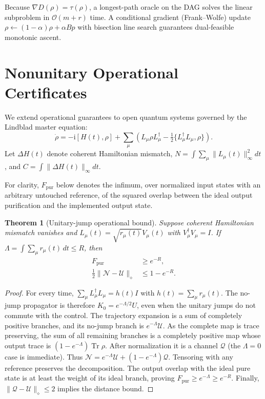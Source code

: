 \documentclass[10pt,letterpaper,journal]{IEEEtran}
\newtheorem{theorem}{Theorem}
\begin{document}
Because $\nabla D(\rho) = \tau(\rho)$, a longest-path oracle on the DAG solves the linear subproblem in $\mathcal{O}(m+r)$ time. A conditional gradient (Frank--Wolfe) update $\rho \leftarrow (1-\alpha)\rho + \alpha B p$ with bisection line search guarantees dual-feasible monotonic ascent.

\section{Nonunitary Operational Certificates}
We extend operational guarantees to open quantum systems governed by the Lindblad master equation:
\begin{equation}
\dot\rho = -\mathrm{i}[H(t), \rho] + \sum_\mu \left( L_\mu \rho L_\mu^\dagger - \tfrac{1}{2}\{L_\mu^\dagger L_\mu, \rho\} \right).
\end{equation}
Let $\Delta H(t)$ denote coherent Hamiltonian mismatch, $N = \int \sum_\mu \|L_\mu(t)\|_\infty^2 dt$, and $C = \int \|\Delta H(t)\|_\infty dt$.

For clarity, $F_{\mathrm{pur}}$ below denotes the infimum, over normalized input states with an arbitrary untouched reference, of the squared overlap between the ideal output purification and the implemented output state.
\begin{theorem}[Unitary-jump operational bound]\label{th:noise}
Suppose coherent Hamiltonian mismatch vanishes and $L_\mu(t)=\sqrt{r_\mu(t)}V_\mu(t)$ with $V_\mu^\dagger V_\mu=I$. If $\Lambda=\int\sum_\mu r_\mu(t)\,dt\le R$, then
\begin{align}
F_{\mathrm{pur}}&\ge e^{-R},\\
\tfrac12\|\mathcal N-\mathcal U\|_\diamond&\le1-e^{-R}.
\end{align}
\end{theorem}
\begin{proof}
For every time, $\sum_\mu L_\mu^\dagger L_\mu=h(t)I$ with $h(t)=\sum_\mu r_\mu(t)$. The no-jump propagator is therefore $K_0=e^{-\Lambda/2}U$, even when the unitary jumps do not commute with the control. The trajectory expansion is a sum of completely positive branches, and its no-jump branch is $e^{-\Lambda}\mathcal U$. As the complete map is trace preserving, the sum of all remaining branches is a completely positive map whose output trace is $(1-e^{-\Lambda})\operatorname{Tr}\rho$. After normalization it is a channel $\mathcal Q$ (the $\Lambda=0$ case is immediate). Thus $\mathcal N=e^{-\Lambda}\mathcal U+(1-e^{-\Lambda})\mathcal Q$. Tensoring with any reference preserves the decomposition. The output overlap with the ideal pure state is at least the weight of its ideal branch, proving $F_{\mathrm{pur}}\ge e^{-\Lambda}\ge e^{-R}$. Finally, $\|\mathcal Q-\mathcal U\|_\diamond\le2$ implies the distance bound.
\end{proof}
\end{document}
